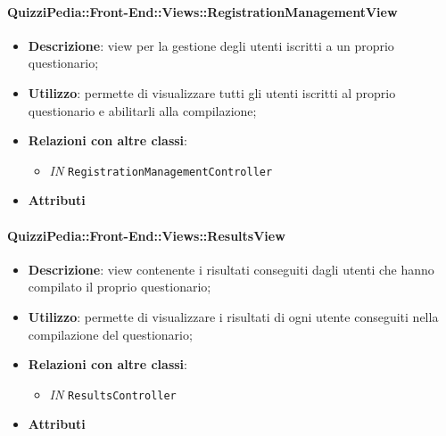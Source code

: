 \paragraph{QuizziPedia::Front-End::Views::RegistrationManagementView}
\begin{itemize}
	\item \textbf{Descrizione}: view per la gestione degli utenti iscritti a un proprio questionario;
	\item \textbf{Utilizzo}: permette di visualizzare tutti gli utenti iscritti al proprio questionario e abilitarli alla compilazione;
	\item \textbf{Relazioni con altre classi}:
	\begin{itemize}
		\item \textit{IN} \texttt{RegistrationManagementController} \\
	\end{itemize}
	\item \textbf{Attributi}
\end{itemize}

\paragraph{QuizziPedia::Front-End::Views::ResultsView}
\begin{itemize}
	\item \textbf{Descrizione}: view contenente i risultati conseguiti dagli utenti che hanno compilato il proprio questionario;
	\item \textbf{Utilizzo}: permette di visualizzare i risultati di ogni utente conseguiti nella compilazione del questionario;
	\item \textbf{Relazioni con altre classi}:
	\begin{itemize}
		\item \textit{IN} \texttt{ResultsController} \\
	\end{itemize}
	\item \textbf{Attributi}
\end{itemize}
